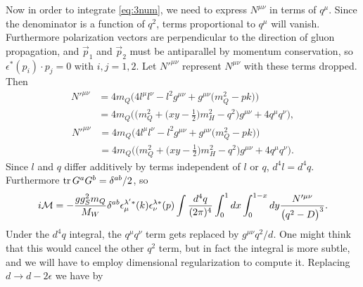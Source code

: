 Now in order to integrate \eqref{eq:3num}, we need to express $N^{\mu\nu}$
in terms of $q^\mu$. Since the denominator is a function of $q^2$, terms
proportional to $q^\mu$ will vanish. Furthermore polarization vectors are
perpendicular to the direction of gluon propagation, and $\vec{p}_1$ and
$\vec{p}_2$ must be antiparallel by momentum conservation, so
$\epsilon^*(p_i)\cdot p_j=0$ with $i,j=1,2$. Let $N'^{\mu\nu}$ represent
$N^{\mu\nu}$ with these terms dropped. Then
\begin{equation}
  \begin{aligned}
    N'^{\mu\nu}&=4m_Q\Big(4l^\mu l^\nu-l^2g^{\mu\nu}
                    +g^{\mu\nu}\big(m_Q^2-pk\big)\Big) \\
               &=4m_Q\Bigg(\Big(m_Q^2
                    +\Big(xy-\tfrac{1}{2}\Big)m_H^2-q^2\Big)g^{\mu\nu}
                    +4q^\mu q^\nu\Bigg),
  \end{aligned}
\end{equation}
\begin{equation}
  \begin{aligned}
    N'^{\mu\nu}&=4m_Q\Big(4l^\mu l^\nu-l^2g^{\mu\nu}
                    +g^{\mu\nu}\big(m_Q^2-pk\big)\Big) \\
               &=4m_Q\Bigg(\Big(m_Q^2
                    +\Big(xy-\tfrac{1}{2}\Big)m_H^2-q^2\Big)g^{\mu\nu}
                    +4q^\mu q^\nu\Bigg).
  \end{aligned}
\end{equation}
Since $l$ and $q$ differ additively by terms independent of $l$ or $q$,
$d^4l=d^4q$. Furthermore $\tr G^aG^b=\delta^{ab}/2$, so
\begin{equation}
  \label{eq:53}
  i\mathcal{M}=-\frac{gg_S^2m_Q}{M_W}\delta^{ab}\epsilon^{\lambda'*}_\mu(k)
           \epsilon^{\lambda*}_\nu(p)\int\frac{d^4q}{(2\pi)^4}
           \int_0^1dx\int_0^{1-x}dy\frac{N'^{\mu\nu}}{\big(q^2-D\big)^3}.
\end{equation}
Under the $d^4q$ integral, the $q^\mu q^\nu$ term gets replaced by
$g^{\mu\nu}q^2/d$. One might think that this would cancel the other $q^2$
term, but in fact the integral is more subtle, and we will have to
employ dimensional regularization to compute it. Replacing
$d\to d-2\epsilon$ we have by \cite[A.45]{peskin_introduction_1995}
